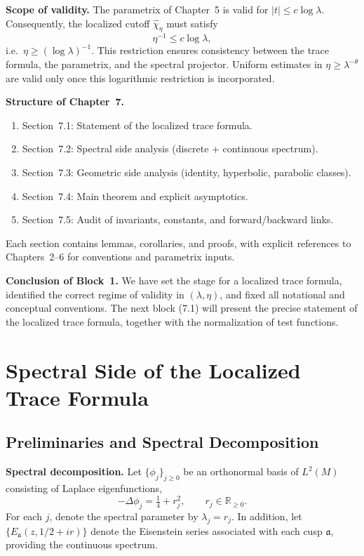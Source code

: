 \medskip

\noindent
\textbf{Scope of validity.}
The parametrix of Chapter~5 is valid for $|t|\le c\log\lambda$.
Consequently, the localized cutoff $\widehat{\chi}_\eta$ must satisfy
\[
  \eta^{-1}\le c\log\lambda,
\]
i.e.\ $\eta\ge (\log\lambda)^{-1}$.
This restriction ensures consistency between the trace formula,
the parametrix, and the spectral projector.
Uniform estimates in $\eta\ge\lambda^{-\theta}$ are valid
only once this logarithmic restriction is incorporated.

\medskip

\noindent
\textbf{Structure of Chapter~7.}
\begin{enumerate}
  \item Section~7.1: Statement of the localized trace formula.
  \item Section~7.2: Spectral side analysis (discrete + continuous spectrum).
  \item Section~7.3: Geometric side analysis (identity, hyperbolic, parabolic classes).
  \item Section~7.4: Main theorem and explicit asymptotics.
  \item Section~7.5: Audit of invariants, constants, and forward/backward links.
\end{enumerate}
Each section contains lemmas, corollaries, and proofs,
with explicit references to Chapters~2--6 for conventions and parametrix inputs.

\medskip

\noindent
\textbf{Conclusion of Block~1.}
We have set the stage for a localized trace formula,
identified the correct regime of validity in $(\lambda,\eta)$,
and fixed all notational and conceptual conventions.
The next block (7.1) will present the precise statement of the localized trace formula,
together with the normalization of test functions.


\section{Spectral Side of the Localized Trace Formula}

\subsection{Preliminaries and Spectral Decomposition}

\noindent\textbf{Spectral decomposition.}
Let $\{ \phi_j \}_{j\geq 0}$ be an orthonormal basis of $L^2(M)$ consisting of Laplace eigenfunctions,
\[
  -\Delta \phi_j = \tfrac{1}{4}+r_j^2, \qquad r_j\in \mathbb{R}_{\geq 0}.
\]
For each $j$, denote the spectral parameter by $\lambda_j = r_j$.  
In addition, let $\{ E_\mathfrak{a}(z,1/2+ir) \}$ denote the Eisenstein series associated with each cusp $\mathfrak{a}$,
providing the continuous spectrum.  

